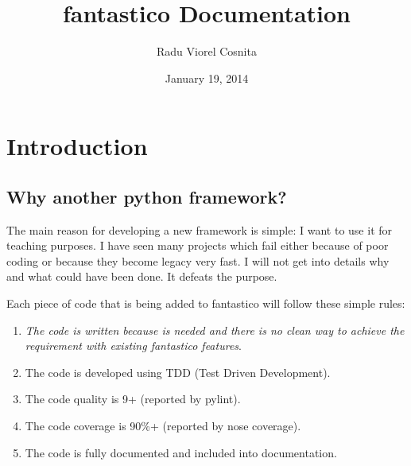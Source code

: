 \documentclass[letterpaper,10pt,english]{sphinxmanual}
\title{fantastico Documentation}
\date{January 19, 2014}
\author{Radu Viorel Cosnita}
\begin{document}
\maketitle
\tableofcontents
{}\label{index::doc}



\chapter{Introduction}
\label{intro:introduction}\label{intro::doc}\label{intro:fantastico-framework}

\section{Why another python framework?}
\label{intro:why-another-python-framework}
The main reason for developing a new framework is simple: I want to use it for teaching purposes. I have seen many projects which
fail either because of poor coding or because they become legacy very fast. I will not get into details why and what could have
been done. It defeats the purpose.

Each piece of code that is being added to fantastico will follow these simple rules:
\begin{enumerate}
\item {} 
\emph{The code is written because is needed and there is no clean way to achieve the requirement with existing fantastico features}.

\item {} 
The code is developed using TDD (Test Driven Development).

\item {} 
The code quality is 9+ (reported by pylint).

\item {} 
The code coverage is 90\%+ (reported by nose coverage).

\item {} 
The code is fully documented and included into documentation.

\end{enumerate}
\end{document}
